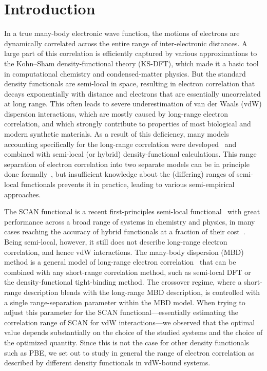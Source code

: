 \section{Introduction}

In a true many-body electronic wave function, the motions of electrons are dynamically correlated across the entire range of inter-electronic distances.
A large part of this correlation is efficiently captured by various approximations to the Kohn--Sham density-functional theory (KS-DFT), which made it a basic tool in computational chemistry and condensed-matter physics.
But the standard density functionals are semi-local in space, resulting in electron correlation that decays exponentially with distance and electrons that are essentially uncorrelated at long range.
This often leads to severe underestimation of van der Waals (vdW) dispersion interactions, which are mostly caused by long-range electron correlation, and which strongly contribute to properties of most biological and modern synthetic materials.
As a result of this deficiency, many models accounting specifically for the long-range correlation were developed~\cite{DionPRL04,VydrovJCP10a,BeckeJCP07,TkatchenkoPRL09,GrimmeJCP10,AmbrosettiJCP14} and combined with semi-local (or hybrid) density-functional calculations.
This range separation of electron correlation into two separate models can be in principle done formally~\cite{HermannCR17}, but insufficient knowledge about the (differing) ranges of semi-local functionals prevents it in practice, leading to various semi-empirical approaches.

The SCAN functional is a recent first-principles semi-local functional~\cite{SunPRL15} with great performance across a broad range of systems in chemistry and physics, in many cases reaching the accuracy of hybrid functionals at a fraction of their cost~\cite{SunNC16}.
Being semi-local, however, it still does not describe long-range electron correlation, and hence vdW interactions.
The many-body dispersion (MBD) method is a general model of long-range electron correlation~\cite{TkatchenkoPRL12,AmbrosettiJCP14} that can be combined with any short-range correlation method, such as semi-local DFT or the density-functional tight-binding method.
The crossover regime, where a short-range description blends with the long-range MBD description, is controlled with a single range-separation parameter within the MBD model.
When trying to adjust this parameter for the SCAN functional---essentially estimating the correlation range of SCAN for vdW interactions---we observed that the optimal value depends substantially on the choice of the studied systems and the choice of the optimized quantity.
Since this is not the case for other density functionals such as PBE, we set out to study in general the range of electron correlation as described by different density functionals in vdW-bound systems.

